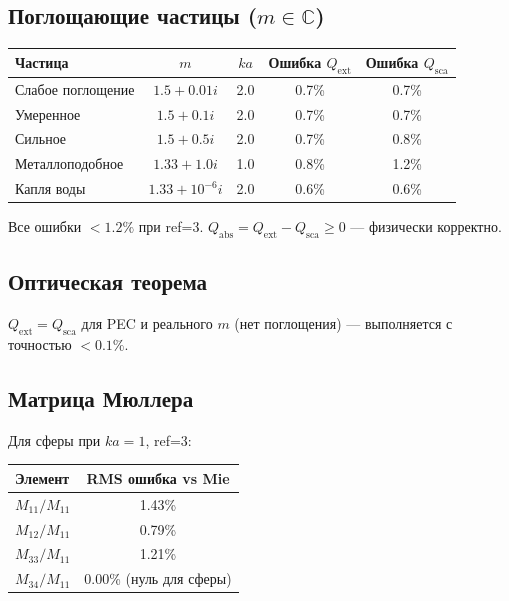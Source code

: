 \documentclass[12pt,a4paper]{article}
\begin{document}
\subsection{Поглощающие частицы ($m \in \mathbb{C}$)}

\begin{center}
\begin{tabular}{lcccc}
\toprule
Частица & $m$ & $ka$ & Ошибка $Q_{\mathrm{ext}}$ & Ошибка $Q_{\mathrm{sca}}$ \\
\midrule
Слабое поглощение & $1.5 + 0.01i$ & 2.0 & 0.7\% & 0.7\% \\
Умеренное & $1.5 + 0.1i$ & 2.0 & 0.7\% & 0.7\% \\
Сильное & $1.5 + 0.5i$ & 2.0 & 0.7\% & 0.8\% \\
Металлоподобное & $1.33 + 1.0i$ & 1.0 & 0.8\% & 1.2\% \\
Капля воды & $1.33 + 10^{-6}i$ & 2.0 & 0.6\% & 0.6\% \\
\bottomrule
\end{tabular}
\end{center}

Все ошибки $< 1.2\%$ при ref=3. $Q_{\mathrm{abs}} = Q_{\mathrm{ext}} - Q_{\mathrm{sca}} \geq 0$ --- физически корректно.

\subsection{Оптическая теорема}

$Q_{\mathrm{ext}} = Q_{\mathrm{sca}}$ для PEC и реального $m$ (нет поглощения) --- выполняется с точностью $< 0.1\%$.

\subsection{Матрица Мюллера}

Для сферы при $ka=1$, ref=3:
\begin{center}
\begin{tabular}{lc}
\toprule
Элемент & RMS ошибка vs Mie \\
\midrule
$M_{11}/M_{11}$ & 1.43\% \\
$M_{12}/M_{11}$ & 0.79\% \\
$M_{33}/M_{11}$ & 1.21\% \\
$M_{34}/M_{11}$ & 0.00\% (нуль для сферы) \\
\bottomrule
\end{tabular}
\end{center}
\end{document}
